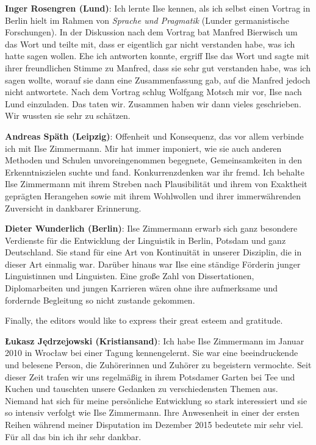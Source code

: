 \documentclass[output=paper,colorlinks,citecolor=brown]{langscibook}
\begin{document}
\noindent \textbf{Inger Rosengren (Lund)}: Ich lernte Ilse kennen, als ich selbst einen Vortrag in Berlin hielt im Rahmen von \textit{Sprache und Pragmatik} (Lunder germanistische Forschungen). In der Diskussion nach dem Vortrag bat Manfred Bierwisch um das Wort und teilte mit, dass er eigentlich gar nicht verstanden habe, was ich hatte sagen wollen. Ehe ich antworten konnte, ergriff Ilse das Wort und sagte mit ihrer freundlichen Stimme zu Manfred, dass sie sehr gut verstanden habe, was ich sagen wollte, worauf sie dann eine Zusammenfassung gab, auf die Manfred jedoch nicht antwortete. Nach dem Vortrag schlug Wolfgang Motsch mir vor, Ilse nach Lund einzuladen. Das taten wir. Zusammen haben wir dann vieles geschrieben. Wir wussten sie sehr zu schätzen. \medskip

\noindent \textbf{Andreas Späth (Leipzig)}: Offenheit und Konsequenz, das vor allem verbinde ich mit Ilse Zimmermann. Mir hat immer imponiert, wie sie auch anderen Methoden und Schulen unvoreingenommen begegnete, Gemeinsamkeiten in den Erkenntniszielen suchte und fand. Konkurrenzdenken war ihr fremd. Ich behalte Ilse Zimmermann mit ihrem Streben nach Plausibilität und ihrem von Exaktheit ge\-präg\-ten Herangehen sowie mit ihrem Wohlwollen und ihrer immerwährenden Zuversicht in dankbarer Erinnerung. \medskip

\largerpage
\noindent \textbf{Dieter Wunderlich (Berlin)}: Ilse Zimmermann erwarb sich ganz besondere Verdienste für die Entwicklung der Linguistik in Berlin, Potsdam und ganz Deutschland. Sie stand für eine Art von Kontinuität in unserer Disziplin, die in dieser Art einmalig war. Darüber hinaus war Ilse eine ständige Förderin junger Linguistinnen und Linguisten. Eine große Zahl von Dissertationen, Diplomarbeiten und jungen Karrieren wären ohne ihre aufmerksame und fordernde Begleitung so nicht zustande gekommen. \medskip

\noindent Finally, the editors would like to express their great esteem and gratitude. \medskip

\noindent \textbf{Łukasz Jędrzejowski (Kristiansand)}: Ich habe Ilse Zimmermann im Januar 2010 in Wro\-cław bei einer Tagung kennengelernt. Sie war eine beeindruckende und belesene Person, die Zuhörerinnen und Zuhörer zu begeistern vermochte. Seit dieser Zeit trafen wir uns regelmäßig in ihrem Potsdamer Garten bei Tee und Kuchen und tauschten unsere Gedanken zu verschiedensten Themen aus. Niemand hat sich für meine persönliche Entwicklung so stark interessiert und sie so intensiv verfolgt wie Ilse Zimmermann. Ihre Anwesenheit in einer der ersten Reihen während meiner Disputation im Dezember 2015 bedeutete mir sehr viel. Für all das bin ich ihr sehr dankbar. \medskip
\end{document}

